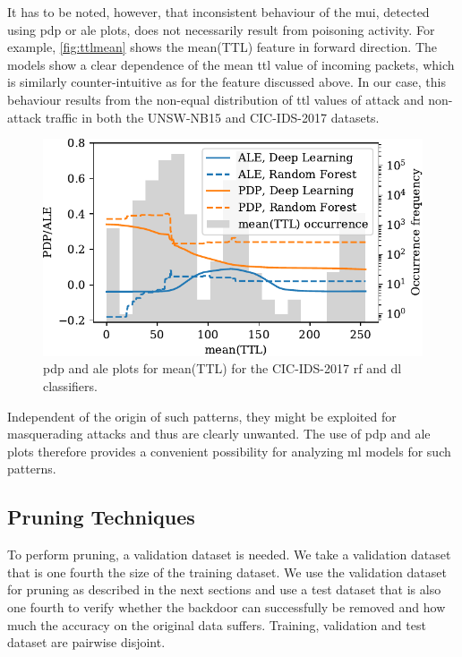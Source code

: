 \documentclass[10pt,sigconf,letterpaper,dvipsnames]{acmart}
\newcommand{\unsw}{UNSW-NB15}
\begin{document}
It has to be noted, however, that inconsistent behaviour of the \gls{mui}, detected using \gls{pdp} or \gls{ale} plots, does not necessarily result from poisoning activity.  For example, \autoref{fig:ttlmean} shows the mean(TTL) feature in forward direction. The models show a clear dependence of the mean \gls{ttl} value of incoming packets, which is similarly counter-intuitive as for the feature discussed above. In our case, this behaviour results from the non-equal distribution of \gls{ttl} values of attack and non-attack traffic in both the \unsw{} and CIC-IDS-2017 datasets.

\begin{figure}[b]
\includegraphics[width=\columnwidth]{figures/ttlmean.pdf}
\caption{\gls{pdp} and \gls{ale} plots for mean(TTL) for the CIC-IDS-2017 \gls{rf} and \gls{dl} classifiers.}
\label{fig:ttlmean}
\end{figure}
Independent of the origin of such patterns, they might be exploited for masquerading attacks and thus are clearly unwanted. The use of \gls{pdp} and \gls{ale} plots therefore provides a convenient possibility for analyzing \gls{ml} models for such patterns.
\subsection{Pruning Techniques}


To perform pruning, a validation dataset is needed. We take a validation dataset that is one fourth the size of the training dataset. We use the validation dataset for pruning as described in the next sections and use a test dataset that is also one fourth to verify whether the backdoor can successfully be removed and how much the accuracy on the original data suffers. Training, validation and test dataset are pairwise disjoint.
\end{document}
